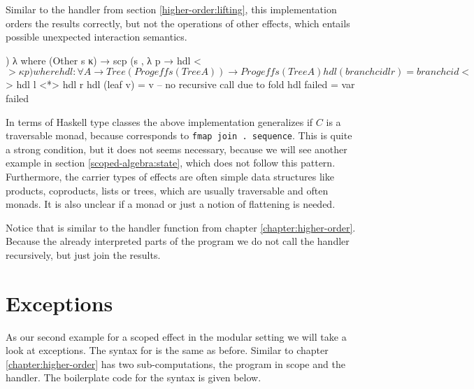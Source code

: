 \begin{AgdaAlign}
Similar to the handler from section \ref{higher-order:lifting}, this
implementation orders the results correctly, but not the operations of other
effects, which entails possible unexpected interaction semantics.

\begin{code}
  ) λ where
    (Other s κ)  → scp (s , λ p → hdl <$> κ p)
  where
    hdl : ∀ {A} → Tree (Prog effs (Tree A)) → Prog effs (Tree A)
    hdl (branch cid l r)  = branch cid <$> hdl l <*> hdl r
    hdl (leaf v)          = v -- no recursive call due to fold
    hdl failed            = var failed
\end{code}
\end{AgdaAlign}
In terms of Haskell type classes the above implementation generalizes if $C$ is
a traversable monad, because  corresponds to
\texttt{fmap join . sequence}.
This is quite a strong condition, but it does not seems necessary, because we
will see another example in section \ref{scoped-algebra:state}, which does not
follow this pattern.
Furthermore, the carrier types of effects are often simple data structures like
products, coproducts, lists or trees, which are usually traversable and often
monads.
It is also unclear if a monad or just a notion of flattening is needed.


Notice that  is similar to the handler function from
chapter \ref{chapter:higher-order}.
Because the  already interpreted parts of the program we do
not call the handler recursively, but just join the results.


\section{Exceptions}

As our second example for a scoped effect in the modular setting we will take a
look at exceptions.
The syntax for  is the same as before.
Similar to chapter \ref{chapter:higher-order}  has two
sub-computations, the program in scope and the handler.
The boilerplate code for the syntax is given below.

